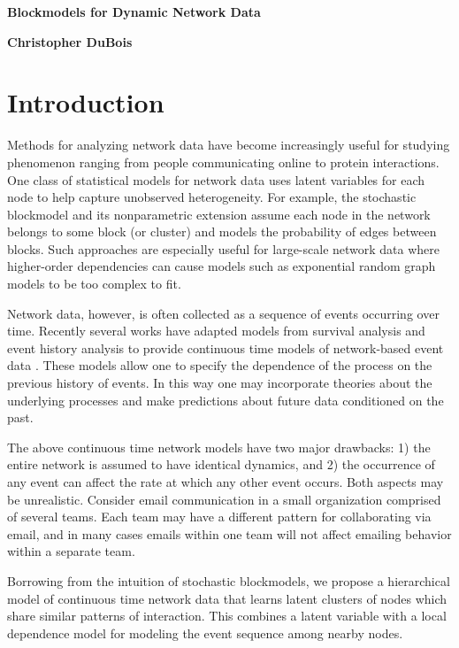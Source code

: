 \documentclass[11pt]{article}
\begin{document}
 

 \centerline{\Large \bf Blockmodels for Dynamic Network Data} 
 \medskip
\centerline{\bf Christopher DuBois}
 \bigskip

\section{Introduction}

Methods for analyzing network data have become increasingly useful for studying  phenomenon ranging from people communicating online to protein interactions. One class of statistical models for network data uses latent variables for each node to help capture unobserved heterogeneity.  For example, the stochastic blockmodel \cite{Nowicki2001} and its nonparametric extension \cite{Kemp2006} assume each node in the network belongs to some block (or cluster) and models the probability of edges between blocks.   Such approaches are especially useful for large-scale network data where higher-order dependencies can cause models such as exponential random graph models to be too complex to fit.

Network data, however, is often collected as a sequence of events occurring over time.   Recently several works have adapted models from survival analysis and event history analysis to provide continuous time models of network-based event data \cite{Butts2008,Brandes2009,Stadtfeld2010,Stadtfeld2011,Opsahl2011,Vu2011}.  These models allow one to specify the dependence of the process on the previous history of events.  In this way one may incorporate theories about the underlying processes and make predictions about future data conditioned on the past.

The above continuous time network models have two major drawbacks: 1) the entire network is assumed to have identical dynamics, and 2) the occurrence of any event can affect the rate at which any other event occurs.  Both aspects may be unrealistic.  Consider email communication in a small organization comprised of several teams.  Each team may have a different pattern for collaborating via email, and in many cases emails within one team will not affect emailing behavior within a separate team.

Borrowing from the intuition of stochastic blockmodels, we propose a hierarchical model of continuous time network data that learns latent clusters of nodes which share similar patterns of interaction.  This combines a latent variable with a local dependence model for modeling the event sequence among nearby nodes. 
\end{document}
